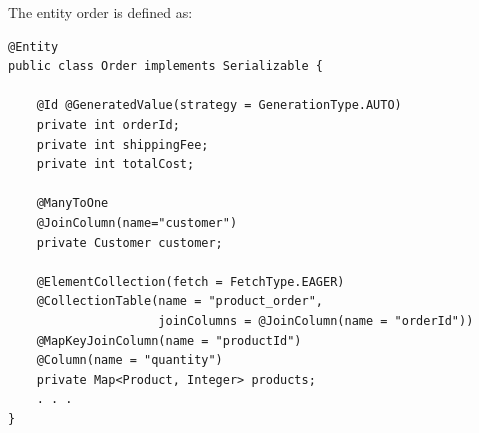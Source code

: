 The entity order is defined as:  
\begin{lstlisting}[style=Java]
@Entity
public class Order implements Serializable {

    @Id @GeneratedValue(strategy = GenerationType.AUTO)
    private int orderId;
    private int shippingFee;
    private int totalCost;

    @ManyToOne
    @JoinColumn(name="customer") 
    private Customer customer;

    @ElementCollection(fetch = FetchType.EAGER)
    @CollectionTable(name = "product_order",
                     joinColumns = @JoinColumn(name = "orderId"))
    @MapKeyJoinColumn(name = "productId") 
    @Column(name = "quantity")
    private Map<Product, Integer> products;
    . . .
}
\end{lstlisting}
